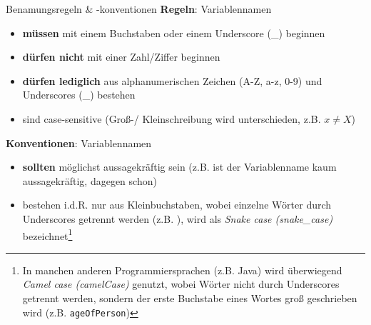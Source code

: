         \begin{frame}{Benamungsregeln \& -konventionen}
            \textbf{Regeln}: Variablennamen
            \begin{itemize}
                \item \textbf{müssen} mit einem Buchstaben oder einem Underscore (\_) beginnen
                \item \textbf{dürfen nicht} mit einer Zahl/Ziffer beginnen
                \item \textbf{dürfen lediglich} aus alphanumerischen Zeichen (A-Z, a-z, 0-9) und Underscores (\_) bestehen
                \item sind case-sensitive (Groß-/ Kleinschreibung wird unterschieden, z.B. $x \neq X$)
            \end{itemize}
            
            \textbf{Konventionen}: Variablennamen
            \begin{itemize}
                \item \textbf{sollten} möglichst aussagekräftig sein (z.B. ist der Variablenname  kaum aussagekräftig,  dagegen schon)
                \item bestehen i.d.R. nur aus Kleinbuchstaben, wobei einzelne Wörter durch Underscores getrennt werden (z.B. ), wird als \textit{Snake case (snake\_case)} bezeichnet\footnote{In manchen anderen Programmiersprachen (z.B. Java) wird überwiegend \textit{Camel case (camelCase)} genutzt, wobei Wörter nicht durch Underscores getrennt werden, sondern der erste Buchstabe eines Wortes groß geschrieben wird (z.B. \texttt{ageOfPerson})}
            \end{itemize}
        \end{frame}
        
